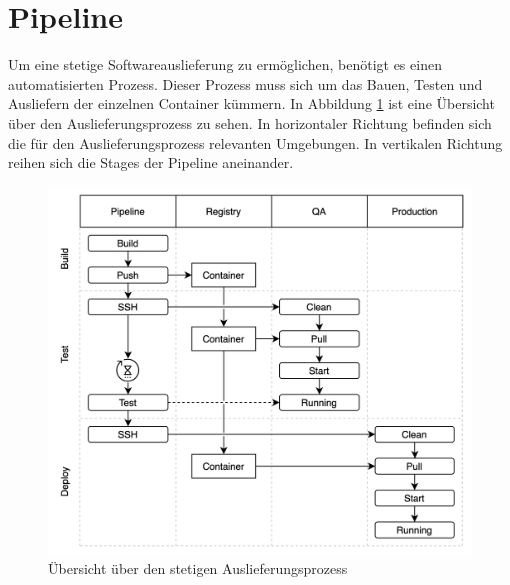 \section{Pipeline}
\label{sec:pipeline}
Um eine stetige Softwareauslieferung zu ermöglichen, benötigt es einen automatisierten
Prozess. Dieser Prozess muss sich um das Bauen, Testen und Ausliefern der einzelnen
Container kümmern. In Abbildung \ref{figure:uebersichtueberdenstetigenauslieferungsprozess}
ist eine Übersicht über den Auslieferungsprozess zu sehen. In horizontaler Richtung
befinden sich die für den Auslieferungsprozess relevanten Umgebungen.
In vertikalen Richtung reihen sich die Stages der Pipeline aneinander.

\begin{figure}
    \begin{center}
    \includegraphics[scale=0.2]{img/abbildungen/Pipeline}
    \end{center}
    \caption{Übersicht über den stetigen Auslieferungsprozess}
    \label{figure:uebersichtueberdenstetigenauslieferungsprozess}
\end{figure}

